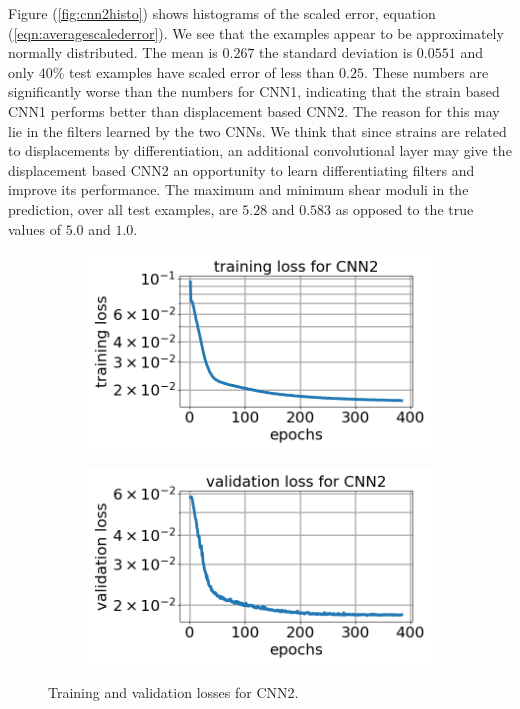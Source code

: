 \documentclass[12pt]{article}
\newcommand{\nhglossheight}{4cm}
\newcommand{\nhglosswidth}{0.48\linewidth}
\begin{document}
Figure (\ref{fig:cnn2histo}) shows histograms of the scaled error, equation (\ref{eqn:averagescalederror}). We see that the examples appear to be approximately normally distributed. The mean is $0.267$ the standard deviation is $0.0551$ and only $40\%$ test examples have scaled error of less than $0.25$. These numbers are significantly worse than the numbers for CNN1, indicating that the strain based CNN1 performs better than displacement based CNN2. The reason for this may lie in the filters learned by the two CNNs. We think that since strains are related to displacements by differentiation, an additional convolutional layer may give the displacement based CNN2 an opportunity to learn differentiating filters and improve its performance. The maximum and minimum shear moduli in the prediction, over all test examples, are $5.28$ and $0.583$ as opposed to the true values of $5.0$ and $1.0$. 
\begin{figure}[!h]
  \centering
  \begin{subfigure}[c]{\nhglosswidth}
    \centering
    \includegraphics[totalheight=\nhglossheight]{Figures/Results2New/loss_cnn2_new.png}
  \end{subfigure}
%  
  \begin{subfigure}[c]{\nhglosswidth}
    \centering
    \includegraphics[totalheight=\nhglossheight]{Figures/Results2New/val_loss_cnn2_new.png}
  \end{subfigure}
  \caption{\label{fig:cnn2losses} Training and validation losses for CNN2.}
\end{figure}
\end{document}
